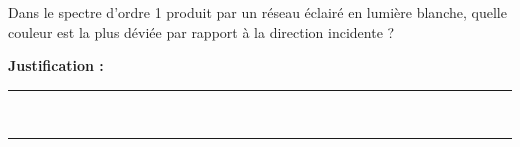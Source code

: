 Dans le spectre d'ordre 1 produit par un réseau éclairé en lumière blanche, quelle couleur est la plus déviée par rapport à la direction incidente ?

\choices

\noindent\textbf{Justification :} \hrulefill \\[2.5ex]
\rule{\linewidth}{0.4pt} \\[2.5ex]
\rule{\linewidth}{0.4pt}
\vfill
